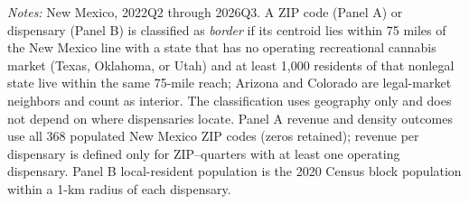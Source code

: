 \begin{table}[htbp]
\begin{minipage}{0.92\textwidth}
\textit{Notes:} New Mexico, 2022Q2 through 2026Q3. A ZIP code (Panel A) or dispensary (Panel B) is classified as \emph{border} if its centroid lies within 75 miles of the New Mexico line with a state that has no operating recreational cannabis market (Texas, Oklahoma, or Utah) and at least 1{,}000 residents of that nonlegal state live within the same 75-mile reach; Arizona and Colorado are legal-market neighbors and count as interior. The classification uses geography only and does not depend on where dispensaries locate. Panel A revenue and density outcomes use all 368 populated New Mexico ZIP codes (zeros retained); revenue per dispensary is defined only for ZIP--quarters with at least one operating dispensary. Panel B local-resident population is the 2020 Census block population within a 1-km radius of each dispensary.
\end{minipage}
\end{table}
